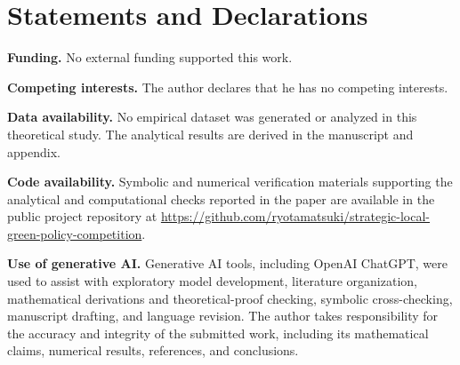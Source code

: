 \section*{Statements and Declarations}

\noindent\textbf{Funding.} No external funding supported this work.

\medskip
\noindent\textbf{Competing interests.} The author declares that he has no competing interests.

\medskip
\noindent\textbf{Data availability.} No empirical dataset was generated or analyzed in this theoretical study. The analytical results are derived in the manuscript and appendix.

\medskip
\noindent\textbf{Code availability.} Symbolic and numerical verification materials supporting the analytical and computational checks reported in the paper are available in the public project repository at \url{https://github.com/ryotamatsuki/strategic-local-green-policy-competition}.

\medskip
\noindent\textbf{Use of generative AI.} Generative AI tools, including OpenAI ChatGPT, were used to assist with exploratory model development, literature organization, mathematical derivations and theoretical-proof checking, symbolic cross-checking, manuscript drafting, and language revision. The author takes responsibility for the accuracy and integrity of the submitted work, including its mathematical claims, numerical results, references, and conclusions.
